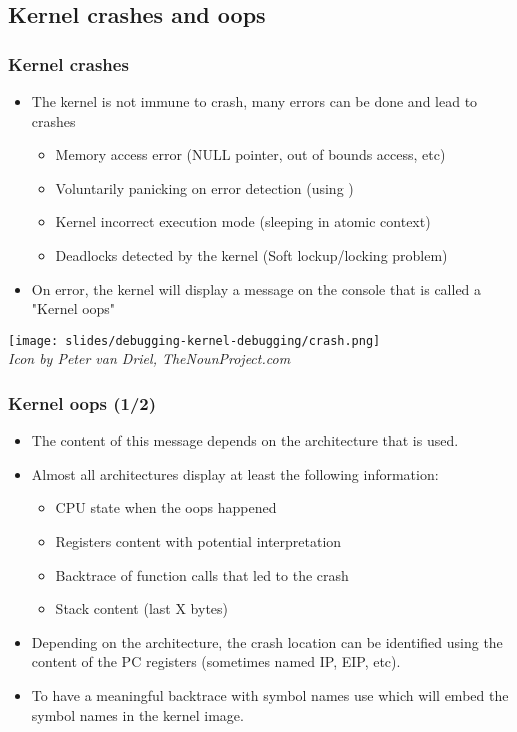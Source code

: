 \subsection{Kernel crashes and oops}

\begin{frame}
  \frametitle{Kernel crashes}
  \begin{itemize}
    \item The kernel is not immune to crash, many errors can be done and lead to
          crashes
    \begin{itemize}
      \item Memory access error (NULL pointer, out of bounds access, etc)
      \item Voluntarily panicking on error detection (using )
      \item Kernel incorrect execution mode (sleeping in atomic context)
      \item Deadlocks detected by the kernel (Soft lockup/locking problem)
    \end{itemize}
    \item On error, the kernel will display a message on the console that
          is called a "Kernel oops"
  \end{itemize}
  \begin{center}
    \center\texttt{[image: slides/debugging-kernel-debugging/crash.png]}\\
    {\tiny {\em Icon by Peter van Driel, TheNounProject.com}}
  \end{center}
\end{frame}

\begin{frame}
  \frametitle{Kernel oops (1/2)}
  \begin{itemize}
    \item The content of this message depends on the architecture that is used.
    \item Almost all architectures display at least the following information:
    \begin{itemize}
      \item CPU state when the oops happened
      \item Registers content with potential interpretation
      \item Backtrace of function calls that led to the crash
      \item Stack content (last X bytes)
    \end{itemize}
    \item Depending on the architecture, the crash location can be identified
          using the content of the PC registers (sometimes named IP, EIP, etc).
    \item To have a meaningful backtrace with symbol names use
           which will embed the
          symbol names in the kernel image.
  \end{itemize}
\end{frame}

